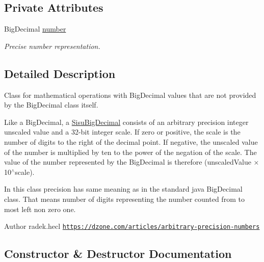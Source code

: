 \subsection*{Private Attributes}
\begin{DoxyCompactItemize}
\item 
Big\+Decimal \hyperlink{classcom_1_1aarrelaakso_1_1drawl_1_1_sisu_big_decimal_af27e00f82037e4c3658558cd6c81af06}{number}
\begin{DoxyCompactList}\small\item\em Precise number representation. \end{DoxyCompactList}\end{DoxyCompactItemize}


\subsection{Detailed Description}
Class for mathematical operations with Big\+Decimal values that are not provided by the Big\+Decimal class itself. 

Like a Big\+Decimal, a \hyperlink{classcom_1_1aarrelaakso_1_1drawl_1_1_sisu_big_decimal}{Sisu\+Big\+Decimal} consists of an arbitrary precision integer unscaled value and a 32-\/bit integer scale. If zero or positive, the scale is the number of digits to the right of the decimal point. If negative, the unscaled value of the number is multiplied by ten to the power of the negation of the scale. The value of the number represented by the Big\+Decimal is therefore (unscaled\+Value × 10$^\wedge$scale). 

In this class precision has same meaning as in the standard java Big\+Decimal class. That means number of digits representing the number counted from to most left non zero one.

\begin{DoxyAuthor}{Author}
radek.\+hecl  \href{https://dzone.com/articles/arbitrary-precision-numbers}{\tt https\+://dzone.\+com/articles/arbitrary-\/precision-\/numbers} 
\end{DoxyAuthor}


\subsection{Constructor \& Destructor Documentation}
\mbox{\label{classcom_1_1aarrelaakso_1_1drawl_1_1_sisu_big_decimal_a67a8c41e95f12142516f7a8f8736386a}} 
